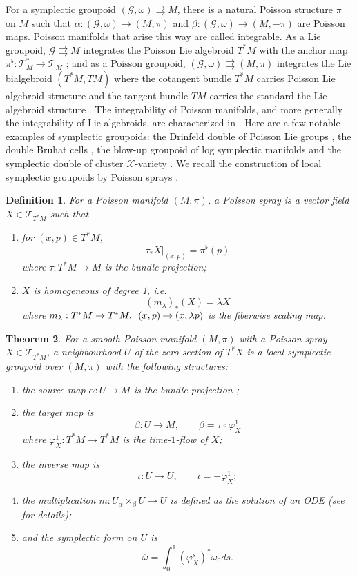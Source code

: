 \documentclass{amsart}
\newtheorem{theorem}{Theorem}[section]
\newtheorem{definition}[theorem]{Definition}
\newcommand{\cG}{\mathcal{G}}
\newcommand{\cX}{\mathcal{X}}
\newcommand{\cT}{\mathcal{T}}
\newcommand{\rra}{\rightrightarrows}
\begin{document}
For a symplectic groupoid $(\cG, \omega) \rra M$, there is a natural Poisson structure $\pi$ on $M$ such that $\alpha: (\cG, \omega) \to (M, \pi)$ and $\beta: (\cG, \omega) \to (M, -\pi)$ are Poisson maps. Poisson manifolds that arise this way are called integrable. As a Lie groupoid, $\cG \rra M$ integrates the Poisson Lie algebroid $T^*M$ with the anchor map $\pi^\flat: \cT^*_M \to \cT_M$ \cite{MR866024}; and as a Poisson groupoid, $(\cG, \omega) \rra (M, \pi)$ integrates the Lie bialgebroid $(T^*M, TM)$ where the cotangent bundle $T^*M$ carries Poisson Lie algebroid structure and the tangent bundle $TM$ carries the standard the Lie algebroid structure \cite{MR1262213}. The integrability of Poisson manifolds, and more generally the integrability of Lie algebroids, are characterized in \cite{MR1973056, MR2128714}. Here are a few notable examples of symplectic groupoids: the Drinfeld double of Poisson Lie groups \cite{MR1054741}, the double Bruhat cells \cite{LuM16}, the blow-up groupoid of log symplectic manifolds \cite{MR3214314} and the symplectic double of cluster $\cX$-variety \cite{MR2470108}. We recall the construction of local symplectic groupoids by Poisson sprays \cite{MR2900786, CMS17}.

\begin{definition}
For a Poisson manifold $(M, \pi)$, a Poisson spray is a vector field $X \in \cT_{T^*M}$ such that
	\begin{enumerate}
		\item for $(x,p) \in T^*M$,
			$$
				\tau_* X|_{(x,p)} = \pi^\flat(p)
			$$
			where $\tau: T^*M \to M$ is the bundle projection;
		\item
			$X$ is homogeneous of degree 1, i.e.
			$$
				(m_\lambda)_*(X) = \lambda X 
			$$
			where $m_\lambda: T^*M \to T^*M, \enskip (x,p) \mapsto (x,\lambda p)$ is the fiberwise scaling map.
	\end{enumerate}
\end{definition}

\begin{theorem} \cite{MR2900786, CMS17} \label{thm:poissp}
For a smooth Poisson manifold $(M, \pi)$ with a Poisson spray $X \in \cT_{T^*M}$, a neighbourhood $U$ of the zero section of $T^*X$ is a local symplectic groupoid over $(M, \pi)$ with the following structures:
	\begin{enumerate}
		\item the source map $\alpha: U \to M$ is the bundle projection ;
		\item the target map is
			$$
				\beta: U \to M, \qquad \beta = \tau \circ \varphi_X^1
			$$
		where $\varphi_X^1: T^*M \to T^*M$ is the time-$1$-flow of $X$;
		\item the inverse map is
			$$
				\iota: U \to U, \qquad \iota = -\varphi_X^1;
			$$
		\item the multiplication $m: U {_\alpha \times_\beta} U \to U$ is defined as the solution of an ODE (see \cite{CMS17} for details);
		\item  and the symplectic form on $U$ is
			$$
				\overline{\omega} = \int_{0}^{1} (\varphi_X^s)^*\omega_0 ds.
			$$
	\end{enumerate}
\end{theorem}
\end{document}
